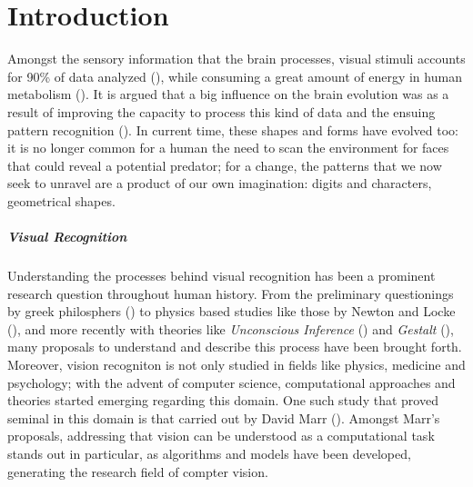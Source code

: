 \chapter*{Introduction}

Amongst the sensory information that the brain processes, visual stimuli accounts 
for 90\% of data analyzed (\cite{potter2014detecting}), while consuming a great amount of energy 
in human metabolism (\cite{phelps1981metabolic}). It is argued that a big influence on the 
brain evolution was as a result of improving the capacity to process this kind of data and the 
ensuing  pattern recognition (\cite{mattson2014superior}). 
In current time, these shapes and forms have evolved too: it is no longer common for a human
the need to scan the environment for faces that could reveal a potential predator; for a change, 
the patterns that we now seek to unravel are a product of our own imagination: digits and 
characters, geometrical shapes.\\

\paragraph{Visual Recognition} Understanding the processes behind visual recognition has been a 
prominent research question throughout human history. From the preliminary questionings by greek  
philosphers (\cite{finger2001origins}) to physics based studies like those by Newton and Locke 
(\cite{swenson2010optics}), and more recently with theories like \textit{Unconscious Inference} 
(\cite{gullstrand1909hemholtz}) and \textit{Gestalt} (\cite{wagemans2012century}), many proposals 
to understand and describe this process have been brought forth. Moreover, vision recogniton is not 
only studied in fields like physics, medicine and psychology; 
with the advent of computer science, computational approaches and theories started emerging 
regarding this domain. One such study that proved seminal in this domain is that carried out by 
David Marr (\cite{poggio1981marr}). Amongst Marr's proposals, addressing that vision can be 
understood as a computational task stands out in particular, as algorithms and models have been 
developed, generating the research field of compter vision.


